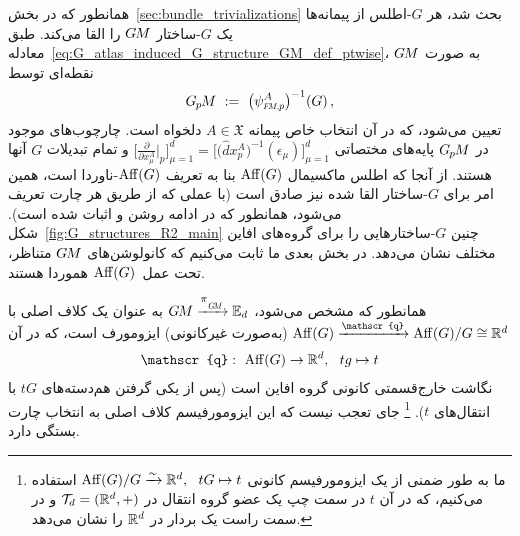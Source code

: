 همانطور که در بخش~\ref{sec:bundle_trivializations} بحث شد، هر $G$-اطلس از پیمانه‌ها یک $G$-ساختار $G\mkern-1.4muM$ را القا می‌کند.
طبق معادله~\eqref{eq:G_atlas_induced_G_structure_GM_def_ptwise}، $G\mkern-1.4muM$ به صورت نقطه‌ای توسط
\begin{align}
	\GpM\ :=\ \big( \psiFMp^A \big)^{-1} (G) \,,
\end{align}
تعیین می‌شود، که در آن انتخاب خاص پیمانه $A \in \mathfrak{X}$ دلخواه است.
چارچوب‌های موجود در $G_{\mkern-1.3mu p}\mkern-1.2muM$ پایه‌های مختصاتی
$\big[ \frac{\partial}{\partial x^A_\mu} \big|_p \big]_{\mu=1}^d = \big[\big(\hat{d}x_p^A \big)^{-1} (\epsilon_\mu) \big]_{\mu=1}^d$
و تمام تبدیلات $G$ آنها هستند.
از آنجا که اطلس ماکسیمال $\operatorname{Aff}(G)$ بنا به تعریف $\operatorname{Aff}(G)$-ناوردا است، همین امر برای $G$-ساختار القا شده نیز صادق است (با عملی که از طریق هر چارت تعریف می‌شود، همانطور که در ادامه روشن و اثبات شده است).
شکل~\ref{fig:G_structures_R2_main} چنین $G$-ساختارهایی را برای گروه‌های افاین مختلف نشان می‌دهد.
در بخش بعدی ما ثابت می‌کنیم که کانولوشن‌های $G\mkern-1.4muM$ متناظر، تحت عمل~$\operatorname{Aff}(G)$ هموردا هستند.


همانطور که مشخص می‌شود، $\GM \xrightarrow{\piGM} \Euc_d$ به عنوان یک کلاف اصلی با $\Aff(G) \xrightarrow{\mathscr{q}} \Aff(G)/G \cong \R^d$ (به‌صورت غیرکانونی) ایزومورف است، که در آن
\begin{align}
	\mathscr{q}:\ \Aff(G) \to \R^d,\ \ tg \mapsto t
\end{align}
نگاشت خارج‌قسمتی کانونی گروه افاین است (پس از یکی گرفتن هم‌دسته‌های $tG$ با انتقال‌های $t$).%
\footnote{
	ما به طور ضمنی از یک ایزومورفیسم کانونی $\operatorname{Aff}(G)/G \xrightarrow{\sim} \mathbb{R}^d,\ \ tG \mapsto t$ استفاده می‌کنیم، که در آن $t$ در سمت چپ یک عضو گروه انتقال در $\mathcal{T}_d = (\mathbb{R}^d,+)$ و در سمت راست یک بردار در $\mathbb{R}^d$ را نشان می‌دهد.
}
جای تعجب نیست که این ایزومورفیسم کلاف اصلی به انتخاب چارت بستگی دارد.

